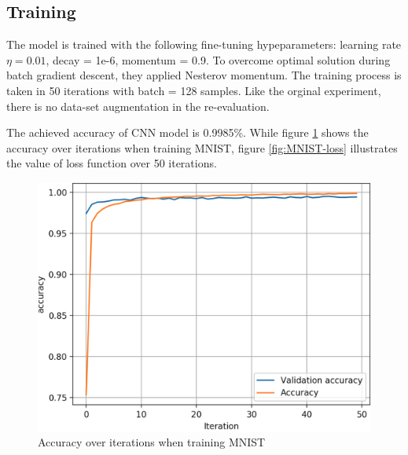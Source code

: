 \documentclass[12pt]{article}
\begin{document}
\subsection{Training}
The model is trained with the following fine-tuning hypeparameters: learning rate $\eta = 0.01$, decay = 1e-6, momentum = 0.9. To overcome optimal solution during batch gradient descent, they applied Nesterov momentum. The training process is taken in 50 iterations with batch = 128 samples. Like the orginal experiment, there is no data-set augmentation in the re-evaluation.

The achieved accuracy of CNN model is 0.9985\%. While figure \ref{fig:MNIST-accuracy} shows the accuracy over iterations when training MNIST, figure \ref{fig:MNIST-loss} illustrates the value of loss function over 50 iterations.

\begin{figure}[H]
	\centering
	\caption{Accuracy over iterations when training MNIST}
		\label{fig:MNIST-accuracy}
	\vspace{2mm}
	\includegraphics[scale=0.35]{img/MNIST_accuracy}
\end{figure}
\end{document}
